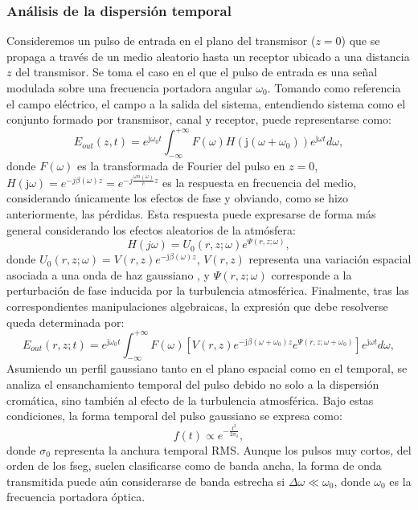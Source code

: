 \subsubsection{Análisis de la dispersión temporal}
Consideremos un pulso de entrada en el plano del transmisor ($z=0$) que se propaga a través de un medio aleatorio hasta un receptor ubicado a una distancia $z$ del transmisor. Se toma el caso en el que el pulso de entrada es una señal modulada sobre una frecuencia portadora angular $\omega_{0}$. Tomando como referencia el campo eléctrico, el campo a la salida del sistema, entendiendo sistema como el conjunto formado por transmisor, canal y receptor, puede representarse como:
\begin{equation}
E_{out}(z,t)=e^{\mathrm{j}\omega_{0}t}\int_{-\infty}^{+\infty}F(\omega)H(\mathrm{j}\left(\omega+\omega_{0}\right))e^{\mathrm{j}\omega t}d\omega,
\end{equation}
donde $F(\omega)$ es la transformada de Fourier del pulso en $z=0$, $H(\mathrm{j}\omega)=e^{-j\beta(\omega)z}=e^{-j\frac{\omega n(\omega)}{c}z}$ es la respuesta en frecuencia del medio, considerando únicamente los efectos de fase y obviando, como se hizo anteriormente, las pérdidas. Esta respuesta puede expresarse de forma más general considerando los efectos aleatorios de la atmósfera:
\begin{equation}
H(j\omega)=U_{0}(r,z;\omega)e^{\Psi\left(r,z;\omega\right)},
\end{equation}
donde $U_{0}(r,z;\omega)=V(r,z)e^{-\mathrm{j}\beta(\omega)z}$, $V(r,z)$ representa una variación espacial asociada a una onda de haz gaussiano \cite{Andrews}, y $\Psi\left(r,z;\omega\right)$ corresponde a la perturbación de fase inducida por la turbulencia atmosférica. Finalmente, tras las correspondientes manipulaciones algebraicas, la expresión que debe resolverse queda determinada por:
\begin{equation}
E_{out}(r,z;t)=e^{\mathrm{j}\omega_{0}t}\int_{-\infty}^{+\infty}F(\omega)\left[V(r,z)e^{-\mathrm{j}\beta\left(\omega+\omega_{0}\right)z}e^{\Psi\left(r,z;\omega+\omega_{0}\right)}\right]e^{\mathrm{j}\omega t}d\omega,
\end{equation}
Asumiendo un perfil gaussiano tanto en el plano espacial como en el temporal, se analiza el ensanchamiento temporal del pulso debido no solo a la dispersión cromática, sino también al efecto de la turbulencia atmosférica. Bajo estas condiciones, la forma temporal del pulso gaussiano se expresa como:
\begin{equation}
f(t)\propto e^{-\frac{t^{2}}{2\sigma_{0}}},
\end{equation}
donde $\sigma_0$ representa la anchura temporal RMS. Aunque los pulsos muy cortos, del orden de los fseg, suelen clasificarse como de banda ancha, la forma de onda transmitida puede aún considerarse de banda estrecha si $\Delta \omega \ll \omega_0$, donde $\omega_0$ es la frecuencia portadora óptica.

